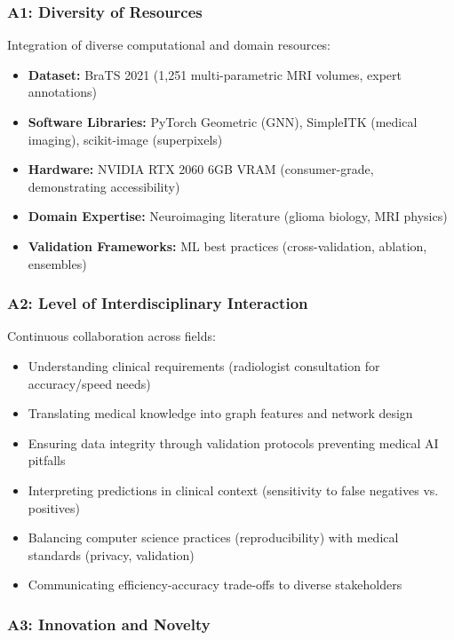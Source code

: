 \subsubsection*{A1: Diversity of Resources}

Integration of diverse computational and domain resources:

\begin{itemize}
    \item \textbf{Dataset:} BraTS 2021 (1,251 multi-parametric MRI volumes, expert annotations)
    \item \textbf{Software Libraries:} PyTorch Geometric (GNN), SimpleITK (medical imaging), scikit-image (superpixels)
    \item \textbf{Hardware:} NVIDIA RTX 2060 6GB VRAM (consumer-grade, demonstrating accessibility)
    \item \textbf{Domain Expertise:} Neuroimaging literature (glioma biology, MRI physics)
    \item \textbf{Validation Frameworks:} ML best practices (cross-validation, ablation, ensembles)
\end{itemize}

\subsubsection*{A2: Level of Interdisciplinary Interaction}

Continuous collaboration across fields:

\begin{itemize}
    \item Understanding clinical requirements (radiologist consultation for accuracy/speed needs)
    \item Translating medical knowledge into graph features and network design
    \item Ensuring data integrity through validation protocols preventing medical AI pitfalls
    \item Interpreting predictions in clinical context (sensitivity to false negatives vs. positives)
    \item Balancing computer science practices (reproducibility) with medical standards (privacy, validation)
    \item Communicating efficiency-accuracy trade-offs to diverse stakeholders
\end{itemize}

\subsubsection*{A3: Innovation and Novelty}

